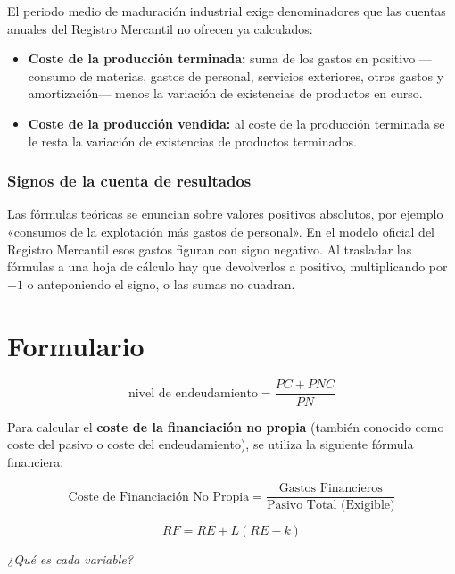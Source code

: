 \documentclass[12pt]{book} %
\providecommand{\tightlist}{%
  \setlength{\itemsep}{0pt}\setlength{\parskip}{0pt}}
\begin{document}
El periodo medio de maduración industrial exige denominadores que las
cuentas anuales del Registro Mercantil no ofrecen ya calculados:

\begin{itemize}
\tightlist
\item
  \textbf{Coste de la producción terminada:} suma de los gastos en
  positivo ---consumo de materias, gastos de personal, servicios
  exteriores, otros gastos y amortización--- menos la variación de
  existencias de productos en curso.
\item
  \textbf{Coste de la producción vendida:} al coste de la producción
  terminada se le resta la variación de existencias de productos
  terminados.
\end{itemize}

\hypertarget{signos-de-la-cuenta-de-resultados}{%
\subsection{Signos de la cuenta de
resultados}\label{signos-de-la-cuenta-de-resultados}}

Las fórmulas teóricas se enuncian sobre valores positivos absolutos, por
ejemplo «consumos de la explotación más gastos de personal». En el
modelo oficial del Registro Mercantil esos gastos figuran con signo
negativo. Al trasladar las fórmulas a una hoja de cálculo hay que
devolverlos a positivo, multiplicando por \(-1\) o anteponiendo el
signo, o las sumas no cuadran.

\hypertarget{formulario}{%
\chapter{Formulario}\label{formulario}}

\[
    \text{nivel de endeudamiento} = \frac{PC + PNC}{PN}
\]

Para calcular el \textbf{coste de la financiación no propia} (también
conocido como coste del pasivo o coste del endeudamiento), se utiliza la
siguiente fórmula financiera:

\[\text{Coste de Financiación No Propia} = \frac{\text{Gastos Financieros}}{\text{Pasivo Total (Exigible)}}\]

\[RF = RE + L(RE - k)\]

\emph{¿Qué es cada variable?}
\end{document}
